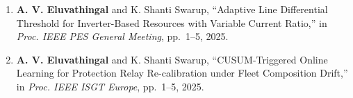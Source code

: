 \begin{enumerate}

\item \textbf{A. V. Eluvathingal} and K. Shanti Swarup,
  ``Adaptive Line Differential Threshold for Inverter-Based Resources
  with Variable Current Ratio,''
  in \textit{Proc. IEEE PES General Meeting},
  pp.~1--5, 2025.

\item \textbf{A. V. Eluvathingal} and K. Shanti Swarup,
  ``CUSUM-Triggered Online Learning for Protection Relay Re-calibration
  under Fleet Composition Drift,''
  in \textit{Proc. IEEE ISGT Europe},
  pp.~1--5, 2025.

\end{enumerate}
